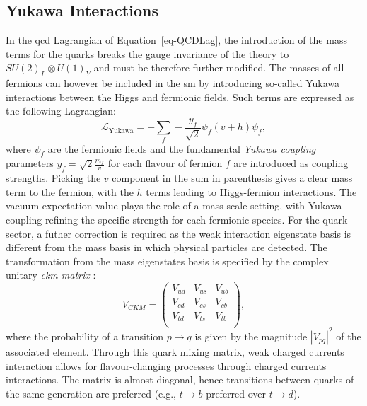 \subsection{Yukawa Interactions}\label{subset-yukint}
In the \gls{qcd} Lagrangian of Equation~\ref{eq-QCDLag}, the introduction of the mass terms for the quarks breaks the gauge invariance of the theory to $SU(2)_L \otimes U(1)_Y$ and must be therefore further modified. The masses of all fermions can however be included in the \gls{sm} by introducing so-called Yukawa interactions between the Higgs and fermionic fields. Such terms are expressed as the following Lagrangian:
\begin{equation}\label{eq-YukLag}
    \mathcal{L}_{\text{Yukawa}} = - \sum_{f} 
    -\frac{y_f}{\sqrt{2}} \bar{\psi}_f (v + h) \psi_f,
\end{equation}
where $\psi_f$ are the fermionic fields and the fundamental \textit{Yukawa coupling} parameters $y_f = \sqrt{2} \frac{m_f}{v}$ for each flavour of fermion $f$ are introduced as coupling strengths. Picking the $v$ component in the sum in parenthesis gives a clear mass term to the fermion, with the $h$ terms leading to Higgs-fermion interactions. The vacuum expectation value plays the role of a mass scale setting, with Yukawa coupling refining the specific strength for each fermionic species. For the quark sector, a futher correction is required as the weak interaction eigenstate basis is different from the mass basis in which physical particles are detected. The transformation from the mass eigenstates basis is specified by the complex unitary \textit{\gls{ckm} matrix} \cite{Tanabashi:2018oca}:
\begin{equation}
    V_{CKM} = \begin{pmatrix}
            V_{ud} & V_{us} & V_{ub}\\ 
            V_{cd} & V_{cs} & V_{cb}\\ 
            V_{td} & V_{ts} & V_{tb}\\ 
        \end{pmatrix},
\end{equation}
where the probability of a transition $p \rightarrow q$ is given by the magnitude $|V_{pq}|^2$ of the associated element. Through this quark mixing matrix, weak charged currents interaction allows for flavour-changing processes through charged currents interactions. The matrix is almost diagonal, hence transitions between quarks of the same generation are preferred (e.g., $t \rightarrow b$ preferred over $t \rightarrow d$).

